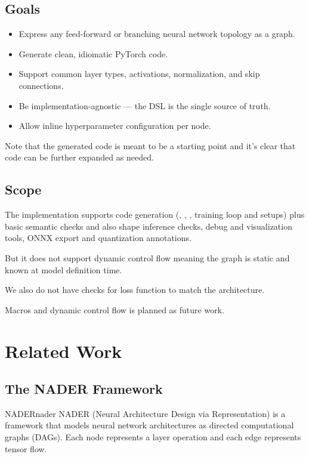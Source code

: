 \documentclass{nngraph-en}
\begin{document}
\section{Goals}

\begin{itemize}
    \item Express any feed-forward or branching neural network topology as a graph.
    \item Generate clean, idiomatic PyTorch code.
    \item Support common layer types, activations, normalization, and skip connections.
    \item Be implementation-agnostic --- the DSL is the single source of truth.
    \item Allow inline hyperparameter configuration per node.
\end{itemize}

\begin{notebox}
Note that the generated code is meant to be a starting point and it's clear that code can be further expanded as needed.
\end{notebox}

\section{Scope}

The implementation supports code generation (, , , training loop and setups) plus basic semantic checks and also shape inference checks, debug and visualization tools, ONNX export and quantization annotations.

But it does not support dynamic control flow meaning the graph is static and known at model definition time.

We also do not have checks for loss function to match the architecture.

Macros and dynamic control flow is planned as future work.

\chapter{Related Work}

\section{The NADER Framework}

\begin{dfnbox}{NADER}{nader}
NADER (Neural Architecture Design via Representation) is a framework that models neural network architectures as directed computational graphs (DAGs). Each node represents a layer operation and each edge represents tensor flow.
\end{dfnbox}
\end{document}
